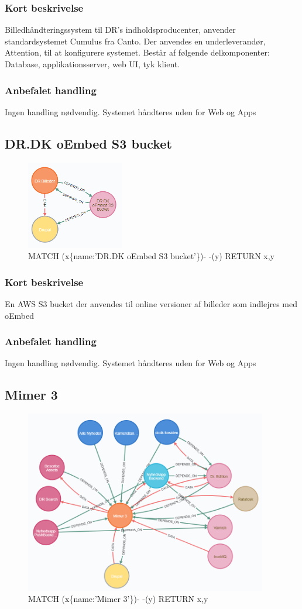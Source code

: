 \documentclass{article}
\begin{document}
\subsubsection*{Kort beskrivelse}
Billedhåndteringssystem til DR's indholdsproducenter, anvender standardsystemet Cumulus fra Canto. Der anvendes en underleverandør, Attention, til at konfigurere systemet. Består af følgende delkomponenter: Database, applikationsserver, web UI, tyk klient.
\subsubsection*{Anbefalet handling}
Ingen handling nødvendig. Systemet håndteres uden for Web og Apps



\subsection{DR.DK oEmbed S3 bucket}
\begin{figure}[h]
\includegraphics[width=120pt]{S3Bucket.PNG}
\caption{MATCH (x\{name:'DR.DK oEmbed S3 bucket'\})- -(y) RETURN x,y}
\end{figure}
\subsubsection*{Kort beskrivelse}
En AWS S3 bucket der anvendes til online versioner af billeder som indlejres med oEmbed
\subsubsection*{Anbefalet handling}
Ingen handling nødvendig. Systemet håndteres uden for Web og Apps



\subsection{Mimer 3}
\begin{figure}[h]
\includegraphics[width=300pt]{Mimer3.PNG}
\caption{MATCH (x\{name:'Mimer 3'\})- -(y) RETURN x,y}
\end{figure}
\end{document}
